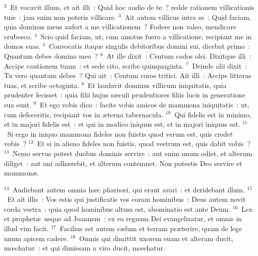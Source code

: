 ${}^{2}$~Et vocavit illum, et ait illi~: Quid hoc audio de te~? redde rationem villicationis tu\ae~: jam enim non poteris villicare.
${}^{3}$~Ait autem villicus intra se~: Quid faciam, quia dominus meus aufert a me villicationem~? Fodere non valeo, mendicare erubesco.
${}^{4}$~Scio quid faciam, ut, cum amotus fuero a villicatione, recipiant me in domos suas.
${}^{5}$~Convocatis itaque singulis debitoribus domini sui, dicebat primo~: Quantum debes domino meo~?
${}^{6}$~At ille dixit~: Centum cados olei. Dixitque illi~: Accipe cautionem tuam~: et sede cito, scribe quinquaginta.
${}^{7}$~Deinde alii dixit~: Tu vero quantum debes~? Qui ait~: Centum coros tritici. Ait illi~: Accipe litteras tuas, et scribe octoginta.
${}^{8}$~Et laudavit dominus villicum iniquitatis, quia prudenter fecisset~: quia filii hujus s\ae culi prudentiores filiis lucis in generatione sua sunt.
${}^{9}$~Et ego vobis dico~: facite vobis amicos de mammona iniquitatis~: ut, cum defeceritis, recipiant vos in \ae terna tabernacula.
${}^{10}$~Qui fidelis est in minimo, et in majori fidelis est~: et qui in modico iniquus est, et in majori iniquus est.
${}^{11}$~Si ergo in iniquo mammona fideles non fuistis quod verum est, quis credet vobis~?
${}^{12}$~Et si in alieno fideles non fuistis, quod vestrum est, quis dabit vobis~?
${}^{13}$~Nemo servus potest duobus dominis servire~: aut enim unum odiet, et alterum diliget~: aut uni adh\ae rebit, et alterum contemnet. Non potestis Deo servire et mammon\ae .


${}^{14}$~Audiebant autem omnia h\ae c pharis\ae i, qui erant avari~: et deridebant illum.
${}^{15}$~Et ait illis~: Vos estis qui justificatis vos coram hominibus~: Deus autem novit corda vestra~: quia quod hominibus altum est, abominatio est ante Deum.
${}^{16}$~Lex et prophet\ae\ usque ad Joannem~: ex eo regnum Dei evangelizatur, et omnis in illud vim facit.
${}^{17}$~Facilius est autem c\ae lum et terram pr\ae terire, quam de lege unum apicem cadere.
${}^{18}$~Omnis qui dimittit uxorem suam et alteram ducit, mœchatur~: et qui dimissam a viro ducit, mœchatur.



